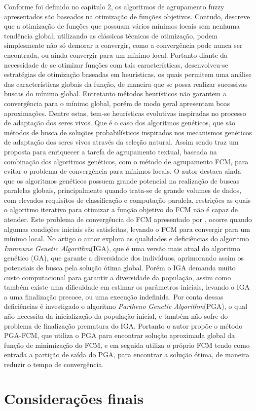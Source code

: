 Conforme foi definido no capítulo 2, os algoritmos de agrupamento fuzzy apresentados são baseados na
otimização de funções objetivos. Contudo, \cite{GasparCunha2012} descreve que a otimização de 
funções que possuam vários mínimos locais
sem nenhuma tendência global, utilizando as clássicas técnicas de otimização, podem simplesmente
não só demorar a convergir, como a convergência pode nunca ser encontrada, ou ainda convergir para
um mínimo local. Portanto diante da necessidade de se otimizar funções com
tais características, desenvolveu-se estratégias de otimização baseadas em heurísticas, os quais
permitem uma análise das características globais da função, de maneira que se possa realizar
sucessivas buscas do mínimo global. Entretanto métodos heurísticos não garantem a convergência para
o mínimo global, porém de modo geral apresentam boas aproximações. Dentre estas, tem-se heurísticas
evolutivas
inspiradas no processo de adaptação dos seres vivos. Que é o caso dos algoritmos
genéticos, que são métodos de busca de soluções probabilísticos inspirados nos mecanismos 
genéticos de adaptação dos seres vivos através da seleção natural. Assim sendo \cite{Jiang2013} 
traz um proposta para enriquecer a tarefa de agrupamento textual, baseada na
combinação dos algoritmos genéticos, com o método de agrupamento FCM, para 
evitar o problema de convergência para mínimos locais. 
O autor destaca ainda que os algoritmos genéticos possuem grande potencial na realização de
buscas paralelas globais, principalmente quando trata-se de grande volumes de dados, com elevados
requisitos de classificação e computação paralela, restrições as quais o algoritmo iterativo para
otimizar a função objetivo do FCM não é capaz de atender.
Este problema de convergência do FCM apresentado por
\cite{Bezdek1984}, ocorre quando algumas condições iniciais são satisfeitas, levando o FCM para 
convergir para um mínimo local. No artigo o autor explora as qualidades e deficiências do algoritmo 
\textit{Immnune Genetic Algorithm}(IGA), que é uma versão mais atual do algoritmo genético (GA),
que garante a diversidade dos indivíduos, aprimorando assim os potenciais de busca pela solução
ótima global. Porém o IGA demanda muito custo computacional para garantir a diversidade da
população, assim como também existe uma dificuldade em estimar os parâmetros iniciais, levando o IGA
a uma finalização precoce, ou uma execução indefinida. Por conta dessas deficiências é investigado
o algoritmo \textit{Partheno Genetic Algorithm}(PGA), o qual não necessita da inicialização da
população inicial, e também não sofre do problema de finalização prematura do IGA. Portanto o autor
propõe o método PGA-FCM, que utiliza o PGA para encontrar solução aproximada global da função de
minimização do FCM, e em seguida utiliza o próprio FCM tendo como entrada a partição de saída do
PGA, para encontrar a solução ótima, de maneira reduzir o tempo de convergência.

 
\section{Considerações finais}
